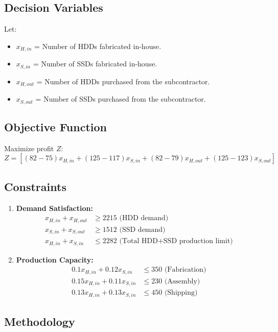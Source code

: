 \documentclass[8pt]{article}
\begin{document}
\subsection*{Decision Variables}
Let:
\begin{itemize}
    \item \( x_{H,in} \) = Number of HDDs fabricated in-house.
    \item \( x_{S,in} \) = Number of SSDs fabricated in-house.
    \item \( x_{H,out} \) = Number of HDDs purchased from the subcontractor.
    \item \( x_{S,out} \) = Number of SSDs purchased from the subcontractor.
\end{itemize}

\subsection*{Objective Function}
Maximize profit \( Z \):
\[
Z = [(82 - 75)x_{H,in} + (125 - 117)x_{S,in} + (82 - 79)x_{H,out} + (125 - 123)x_{S,out}]
\]

\subsection*{Constraints}

\begin{enumerate}
    \item \textbf{Demand Satisfaction:}
    \begin{align*}
    x_{H,in} + x_{H,out} &\geq 2215 \text{ (HDD demand)} \\
    x_{S,in} + x_{S,out} &\geq 1512 \text{ (SSD demand)} \\
    x_{H,in} + x_{S,in} &\leq 2282 \text{ (Total HDD+SSD production limit)}
    \end{align*}
    
    \item \textbf{Production Capacity:}
    \begin{align*}
    0.1x_{H,in} + 0.12x_{S,in} &\leq 350 \text{ (Fabrication)} \\
    0.15x_{H,in} + 0.11x_{S,in} &\leq 230 \text{ (Assembly)} \\
    0.13x_{H,in} + 0.13x_{S,in} &\leq 450 \text{ (Shipping)}
    \end{align*}
\end{enumerate}

\subsection*{Methodology}
\end{document}
